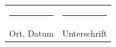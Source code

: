 \documentclass[
	12pt,
	a4paper,
	BCOR10mm,
	DIV14,
	headsepline,
]{scrreprt}
\begin{document}
\bigskip
\bigskip
\bigskip

\begin{center}
\begin{tabular}{ll}
	\rule{0.35\textwidth}{0.4pt} & \rule{0.55\textwidth}{0.4pt} \\
	Ort, Datum & Unterschrift
\end{tabular}
\end{center}
\end{document}
